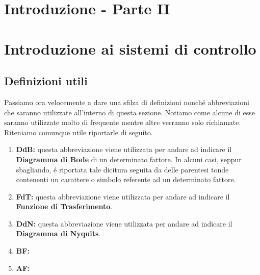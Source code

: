 \documentclass[../main.tex]{subfiles}
\begin{document}
\clearpage
\thispagestyle{empty}
\vspace*{7cm}
\section{Introduzione - Parte II}
\vspace*{1.5cm}






\clearpage
\thispagestyle{empty}
\vspace*{7cm}
\section{Introduzione ai sistemi di controllo}
\vspace*{1.5cm}




\subsection{Definizioni utili}

Passiamo ora velocemente a dare una sfilza di definizioni nonché abbreviazioni che saranno utilizzate all'interno di questa sezione.
Notiamo come alcune di esse saranno utilizzate molto di frequente mentre altre verranno solo richiamate. Riteniamo comunque utile riportarle di seguito.


\begin{enumerate}
	\item[\textbf{-}] \textbf{DdB:} questa abbreviazione viene utilizzata per andare ad indicare il \textbf{Diagramma di Bode} di un determinato fattore. In alcuni casi, seppur sbagliando, é riportata tale dicitura seguita da delle parentesi tonde contenenti un carattere o simbolo referente ad un determinato fattore.
	
	\item[\textbf{-}] \textbf{FdT:} questa abbreviazione viene utilizzata per andare ad indicare il \textbf{Funzione di Trasferimento}.
	
	\item[\textbf{-}] \textbf{DdN:} questa abbreviazione viene utilizzata per andare ad indicare il \textbf{Diagramma di Nyquits}.
	
	\item[\textbf{-}] \textbf{BF:}
	
	\item[\textbf{-}] \textbf{AF:}
	
	
\end{enumerate}
\end{document}
